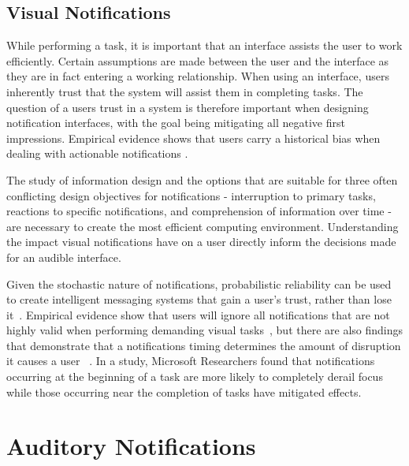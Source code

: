 \subsection{                  Visual Notifications                           }

While performing a task, it is important that an interface assists the user to
work efficiently. Certain assumptions are made between the user and the interface
as they are in fact entering a working relationship.  When using an interface,
users inherently trust that the system will assist them in completing tasks.
The question of a users trust in a system is therefore important when designing
notification interfaces, with the goal being mitigating all negative first
impressions.  Empirical evidence shows that users carry a historical bias when
dealing with actionable notifications \cite{leetiernan2001effective}.

The study of information design and the options that are suitable for three often
conflicting design objectives for notifications - interruption to primary tasks,
reactions to specific notifications, and comprehension of information over time
- are necessary to create the most efficient computing environment.
Understanding the impact visual notifications have on a user directly inform the
decisions made for an audible interface.

Given the stochastic nature of notifications, probabilistic reliability can be
used to create intelligent messaging systems that gain a user's trust, rather
than lose it~\cite{leetiernan2001effective}. Empirical evidence show that users
will ignore all notifications that are not highly valid when performing
demanding visual tasks~\cite{maltz2000cue}, but there are also findings that
demonstrate that a notifications timing determines the amount of disruption it
causes a user ~\cite{cutrell2001notification}.  In a study, Microsoft
Researchers found that notifications occurring at the beginning of a task are
more likely to completely derail focus while those occurring near the completion
of tasks have mitigated effects.

\section{                  Auditory Notifications                            }

